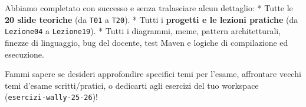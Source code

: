 \documentclass[11pt,a4paper,oneside]{report}
\newcommand{\passthrough}[1]{#1}
\begin{document}
Abbiamo completato con successo e senza tralasciare alcun dettaglio: *
Tutte le \textbf{20 slide teoriche} (da \passthrough{\lstinline!T01!} a
\passthrough{\lstinline!T20!}). * Tutti i \textbf{progetti e le lezioni
pratiche} (da \passthrough{\lstinline!Lezione04!} a
\passthrough{\lstinline!Lezione19!}). * Tutti i diagrammi, meme, pattern
architetturali, finezze di linguaggio, bug del docente, test Maven e
logiche di compilazione ed esecuzione.

Fammi sapere se desideri approfondire specifici temi per l'esame,
affrontare vecchi temi d'esame scritti/pratici, o dedicarti agli
esercizi del tuo workspace
(\passthrough{\lstinline!esercizi-wally-25-26!})!
\end{document}

